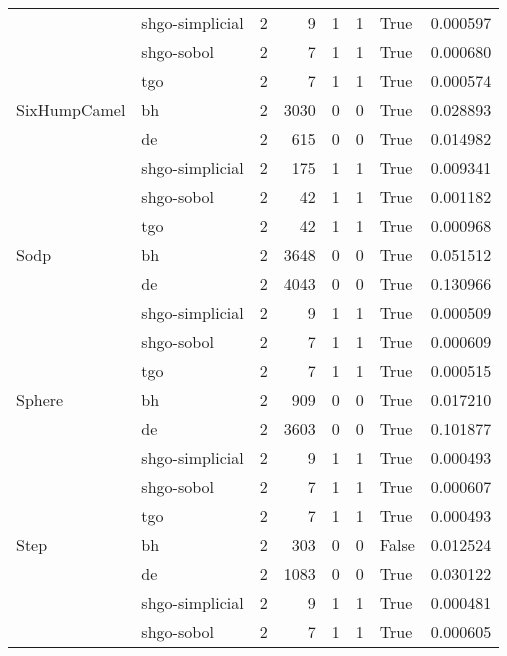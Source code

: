 \begin{longtable}{llrrrrlr}
         & shgo-simplicial &     2 &        9 &      1 &       1 &    True &    0.000597 \\
         & shgo-sobol &     2 &        7 &      1 &       1 &    True &    0.000680 \\
         & tgo &     2 &        7 &      1 &       1 &    True &    0.000574 \\
SixHumpCamel & bh &     2 &     3030 &      0 &       0 &    True &    0.028893 \\
         & de &     2 &      615 &      0 &       0 &    True &    0.014982 \\
         & shgo-simplicial &     2 &      175 &      1 &       1 &    True &    0.009341 \\
         & shgo-sobol &     2 &       42 &      1 &       1 &    True &    0.001182 \\
         & tgo &     2 &       42 &      1 &       1 &    True &    0.000968 \\
Sodp & bh &     2 &     3648 &      0 &       0 &    True &    0.051512 \\
         & de &     2 &     4043 &      0 &       0 &    True &    0.130966 \\
         & shgo-simplicial &     2 &        9 &      1 &       1 &    True &    0.000509 \\
         & shgo-sobol &     2 &        7 &      1 &       1 &    True &    0.000609 \\
         & tgo &     2 &        7 &      1 &       1 &    True &    0.000515 \\
Sphere & bh &     2 &      909 &      0 &       0 &    True &    0.017210 \\
         & de &     2 &     3603 &      0 &       0 &    True &    0.101877 \\
         & shgo-simplicial &     2 &        9 &      1 &       1 &    True &    0.000493 \\
         & shgo-sobol &     2 &        7 &      1 &       1 &    True &    0.000607 \\
         & tgo &     2 &        7 &      1 &       1 &    True &    0.000493 \\
Step & bh &     2 &      303 &      0 &       0 &   False &    0.012524 \\
         & de &     2 &     1083 &      0 &       0 &    True &    0.030122 \\
         & shgo-simplicial &     2 &        9 &      1 &       1 &    True &    0.000481 \\
         & shgo-sobol &     2 &        7 &      1 &       1 &    True &    0.000605 \\

\end{longtable}
